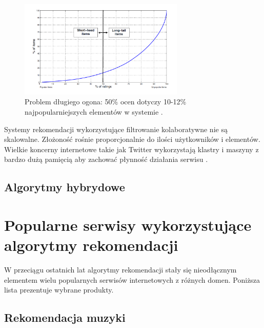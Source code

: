 \documentclass[twoside]{iisthesis}
\begin{document}
  \begin{figure}[!ht] 
 	  	\centering
 	  	\includegraphics[width=0.7\textwidth]{longtail}
 	  	\caption{Problem długiego ogona: 50\% ocen dotyczy 10-12\% najpopularniejszych elementów w systemie \protect\cite{id:RubensRecSysHB2010}.}
 	  	\label{fig:longtail}
  \end{figure}
	 
	 Systemy rekomendacji wykorzystujące filtrowanie kolaboratywne nie są skalowalne. Złożoność rośnie proporcjonalnie do ilości użytkowników i elementów. Wielkie koncerny internetowe takie jak Twitter wykorzystają klastry i maszyny z bardzo dużą pamięcią aby zachować płynność działania serwisu \cite{id:gupta2013wtf}.
	 
	 \subsection{Algorytmy hybrydowe}
	 
	 \section{Popularne serwisy wykorzystujące algorytmy rekomendacji}
	 
		W przeciągu ostatnich lat algorytmy rekomendacji stały się nieodłącznym elementem wielu popularnych serwisów internetowych z różnych domen. Poniższa lista prezentuje wybrane produkty. 
	 
		 \subsection{Rekomendacja muzyki}
	 
\end{document}
